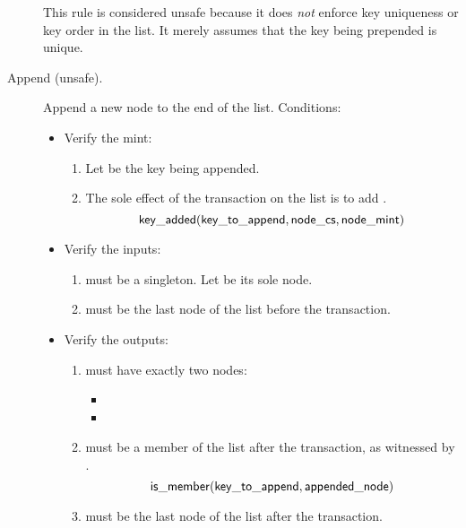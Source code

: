 \documentclass[../midgard.tex]{subfiles}
\begin{document}
\begin{description}
    This rule is considered unsafe because it does \emph{not} enforce key uniqueness or key order in the list.
    It merely assumes that the key being prepended is unique.

    \unorderedListWarning 

    \item[Append (unsafe).] Append a new node to the end of the list.
      Conditions:
        \begin{itemize}
            \item Verify the mint:
            \begin{enumerate}
                \item Let  be the key being appended.
                
                \item The sole effect of the transaction on the list is to add .
                    \begin{equation*}
                        \mathsf{key\_added}(\mathsf{key\_to\_append}, \mathsf{node\_cs}, \mathsf{node\_mint})
                    \end{equation*}
            \end{enumerate}
            
            \item Verify the inputs:
            \begin{enumerate}[resume]
                \item {} must be a singleton.
                  Let  be its sole node.
                \item {} must be the last node of the list before the transaction.
            \end{enumerate}
            
            \item Verify the outputs:
            \begin{enumerate}[resume]
                \item {} must have exactly two nodes:
                    \begin{itemize}
                        \item {}
                        \item {}  
                    \end{itemize}
                \item {} must be a member of the list after the transaction, as witnessed by .
                    \begin{equation*}
                        \mathsf{is\_member} (\mathsf{key\_to\_append}, \mathsf{appended\_node})
                    \end{equation*}
                \item {} must be the last node of the list after the transaction.
    

\end{enumerate}
\end{itemize}
\end{description}
\end{document}
